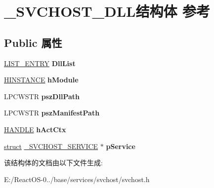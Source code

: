 \hypertarget{struct___s_v_c_h_o_s_t___d_l_l}{}\section{\+\_\+\+S\+V\+C\+H\+O\+S\+T\+\_\+\+D\+L\+L结构体 参考}
\label{struct___s_v_c_h_o_s_t___d_l_l}
\subsection*{Public 属性}
\begin{DoxyCompactItemize}
\item 
\mbox{\label{struct___s_v_c_h_o_s_t___d_l_l_a0882a7677bbf573aadd7f690b72684fa}} 
\hyperlink{struct___l_i_s_t___e_n_t_r_y}{L\+I\+S\+T\+\_\+\+E\+N\+T\+RY} {\bfseries Dll\+List}
\item 
\mbox{\label{struct___s_v_c_h_o_s_t___d_l_l_a374833134c470635cf5573ebe265a7ab}} 
\hyperlink{interfacevoid}{H\+I\+N\+S\+T\+A\+N\+CE} {\bfseries h\+Module}
\item 
\mbox{\label{struct___s_v_c_h_o_s_t___d_l_l_a4f2ec12ef4a0d9abd2f67be83afd0fb5}} 
L\+P\+C\+W\+S\+TR {\bfseries psz\+Dll\+Path}
\item 
\mbox{\label{struct___s_v_c_h_o_s_t___d_l_l_a9e1846f79934732b948b7e793f81abda}} 
L\+P\+C\+W\+S\+TR {\bfseries psz\+Manifest\+Path}
\item 
\mbox{\label{struct___s_v_c_h_o_s_t___d_l_l_a8537c297a7e3b138072064c371332ecb}} 
\hyperlink{interfacevoid}{H\+A\+N\+D\+LE} {\bfseries h\+Act\+Ctx}
\item 
\mbox{\label{struct___s_v_c_h_o_s_t___d_l_l_a207828db09103ceb205c9cc0e478d942}} 
\hyperlink{interfacestruct}{struct} \hyperlink{struct___s_v_c_h_o_s_t___s_e_r_v_i_c_e}{\+\_\+\+S\+V\+C\+H\+O\+S\+T\+\_\+\+S\+E\+R\+V\+I\+CE} $\ast$ {\bfseries p\+Service}
\end{DoxyCompactItemize}


该结构体的文档由以下文件生成\+:\begin{DoxyCompactItemize}
\item 
E\+:/\+React\+O\+S-\/0../base/services/svchost/svchost.\+h\end{DoxyCompactItemize}
